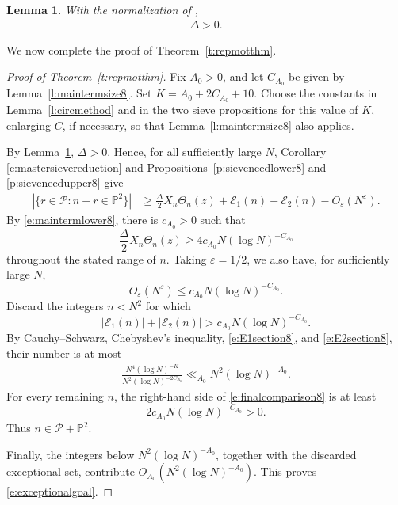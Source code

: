 \documentclass[12pt,reqno]{amsart}
\numberwithin{equation}{section}
\newtheorem{lemma}[equation]{Lemma}
\theoremstyle{definition}
\theoremstyle{remark}
\begin{document}
\begin{lemma}\label{l:numericalcomparison}
With the normalization of \cite[(1.8)--(1.10)]{I80},
\begin{align}\label{e:Deltanumerical}
 \Delta>0.
\end{align}
\end{lemma}


We now complete the proof of Theorem~\ref{t:repmotthm}.

\begin{proof}[Proof of Theorem~\ref{t:repmotthm}]
Fix \(A_0>0\), and let \(C_{A_0}\) be given by
Lemma~\ref{l:maintermsize8}.  Set $ K=A_0+2C_{A_0}+10.$
Choose the constants in Lemma~\ref{l:circmethod} and in the two sieve
propositions for this value of \(K\), enlarging \(C\), if necessary,
so that Lemma~\ref{l:maintermsize8} also applies.

By Lemma~\ref{l:numericalcomparison}, $\Delta>0.$
Hence, for all sufficiently large \(N\), Corollary
\ref{c:mastersievereduction} and
Propositions~\ref{p:sieveneedlower8} and
\ref{p:sieveneedupper8} give
\begin{align}\label{e:finalcomparison8}
 |\{r\in\mathcal P:n-r\in\mathbb P^2\}|
 &\geq
 \frac{\Delta}2X_n\Theta_n(z)
 +\mathcal E_1(n)-\mathcal E_2(n)
 -O_\varepsilon(N^\varepsilon).
\end{align}
By \eqref{e:maintermlower8}, there is \(c_{A_0}>0\) such that
\[
 \frac{\Delta}2X_n\Theta_n(z)
 \geq
 4c_{A_0}N(\log N)^{-C_{A_0}}
\]
throughout the stated range of \(n\).  Taking \(\varepsilon=1/2\), we
also have, for sufficiently large \(N\),
\[
 O_\varepsilon(N^\varepsilon)
 \leq c_{A_0}N(\log N)^{-C_{A_0}}.
\]
Discard the integers \(n<N^2\) for which
\[
 |\mathcal E_1(n)|+|\mathcal E_2(n)|
 >
 c_{A_0}N(\log N)^{-C_{A_0}}.
\]
By Cauchy--Schwarz, Chebyshev's inequality, \eqref{e:E1section8}, and \eqref{e:E2section8}, their number is at most
\begin{align*}
 \frac{
 N^4(\log N)^{-K}
 }{
 N^2(\log N)^{-2C_{A_0}}
 }
 \ll_{A_0}
 N^2(\log N)^{-A_0}.
\end{align*}
For every remaining \(n\), the right-hand side of
\eqref{e:finalcomparison8} is at least
\[
 2c_{A_0}N(\log N)^{-C_{A_0}}>0.
\]
Thus \(n\in\mathcal P+\mathbb P^2\).

Finally, the integers below \(N^2(\log N)^{-A_0}\), together with the
discarded exceptional set, contribute
\(O_{A_0}(N^2(\log N)^{-A_0})\).  This proves
\eqref{e:exceptionalgoal}.
\end{proof}
\end{document}
